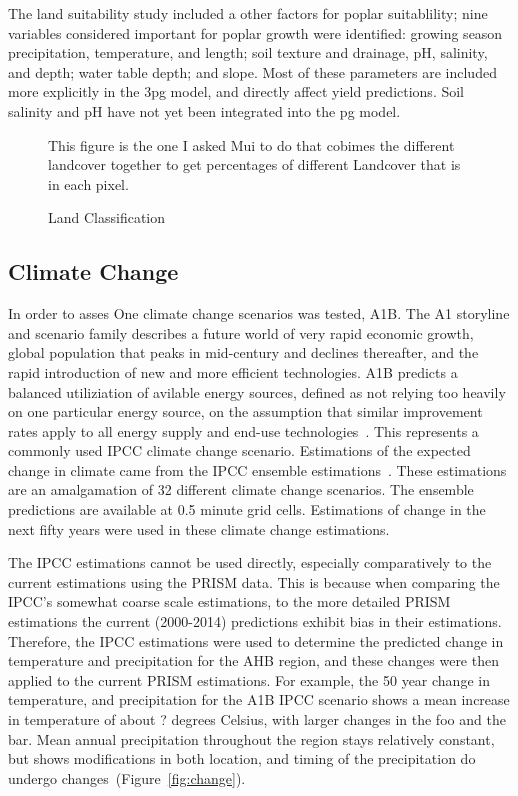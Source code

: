 \documentclass[preprint,12pt]{elsarticle}
\begin{document}
The land suitability study included a other factors for poplar
suitablility; nine variables considered important for poplar growth
were identified: growing season precipitation, temperature, and
length; soil texture and drainage, pH, salinity, and depth; water
table depth; and slope.  Most of these parameters are included more
explicitly in the \ac{3pg} model, and directly affect yield
predictions.  Soil salinity and pH have not yet been integrated into
the \ac{pg} model.




\begin{figure}[hp]
  \centering
  
This figure is the one I asked Mui to do that cobimes the different landcover together to get percentages of  different Landcover that is in each pixel.

  \caption{Land Classification}
  \label{fig:land}
\end{figure}

\subsection{Climate Change}
\label{sec:climate}

In order to asses
One climate change scenarios was tested, A1B. 
%
The A1 storyline and scenario family describes a future world of very
rapid economic growth, global population that peaks in mid-century and
declines thereafter, and the rapid introduction of new and more
efficient technologies. A1B predicts a balanced utiliziation of
avilable energy sources, defined as not relying too heavily on one
particular energy source, on the assumption that similar improvement
rates apply to all energy supply and end-use technologies~\cite{}.
%
This represents a commonly used \ac{IPCC} climate change scenario.
Estimations of the expected change in climate came from the IPCC
ensemble estimations~\cite{ipcc-ensemble}.  These estimations are an
amalgamation of 32 different climate change scenarios.  The ensemble
predictions are available at 0.5 minute grid cells.  Estimations of
change in the next fifty years were used in these climate change
estimations.

The \ac{IPCC} estimations cannot be used directly, especially
comparatively to the current estimations using the \ac{PRISM}
data.  This is because when comparing the \ac{IPCC}'s somewhat coarse
scale estimations, to the more detailed \ac{PRISM} estimations the
current (2000-2014) predictions exhibit bias in their estimations.
Therefore, the \ac{IPCC} estimations were used to determine the
predicted change in temperature and precipitation for the \ac {AHB}
region, and these changes were then applied to the current \ac{PRISM}
estimations. For example, the 50 year change in temperature, and
precipitation for the A1B \ac{IPCC} scenario shows a mean
increase in temperature of about ? degrees Celsius, with larger
changes in the foo and the bar.  Mean annual precipitation throughout
the region stays relatively constant, but shows modifications in both
location, and timing of the precipitation do undergo
changes~(Figure~\ref{fig:change}).
\end{document}
